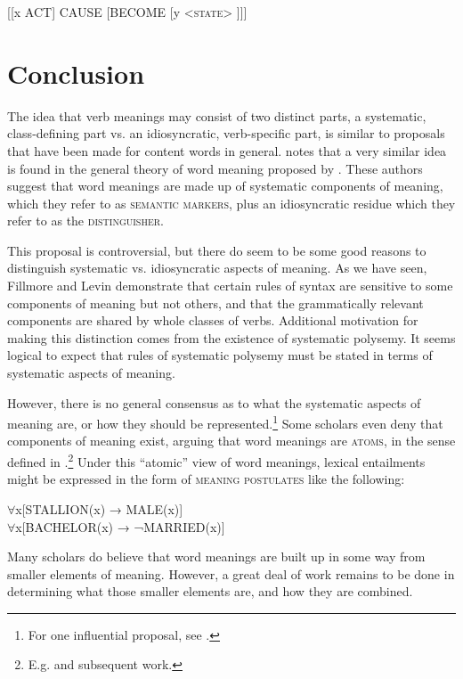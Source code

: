 \ea \label{ex:7.33}
{}[[x ACT] CAUSE [BECOME [y <\textsc{state}> ]]]
\z

\section{Conclusion}\label{sec:} %

The idea that verb meanings may consist of two distinct parts, a systematic, class-defining part vs. an idiosyncratic, verb-specific part, is similar to proposals that have been made for content words in general. \citet[131]{Fillmore1970} notes that a very similar idea is found in the general theory of word meaning proposed by \citet{KatzFodor1963}. These authors suggest that word meanings are made up of systematic components of meaning, which they refer to as \textsc{semantic markers}, plus an idiosyncratic residue which they refer to as the \textsc{distinguisher}.



This proposal is controversial, but there do seem to be some good reasons to distinguish systematic vs. idiosyncratic aspects of meaning. As we have seen, Fillmore and Levin demonstrate that certain rules of syntax are sensitive to some components of meaning but not others, and that the grammatically relevant components are shared by whole classes of verbs. Additional motivation for making this distinction comes from the existence of systematic polysemy. It seems logical to expect that rules of systematic polysemy must be stated in terms of systematic aspects of meaning.



However, there is no general consensus as to what the systematic aspects of meaning are, or how they should be represented.\footnote{For one influential proposal, see \citet{Pustejovsky1995}.} Some scholars even deny that components of meaning exist, arguing that word meanings are \textsc{atoms}, in the sense defined in .\footnote{E.g. \citet{Fodor1975} and subsequent work.} Under this “atomic” view of word meanings, lexical entailments might be expressed in the form of \textsc{meaning postulates} like the following:


\ea
${\forall}$x[STALLION(x) → MALE(x)]\\
${\forall}$x[BACHELOR(x) → ¬MARRIED(x)]
\z


Many scholars do believe that word meanings are built up in some way from smaller elements of meaning. However, a great deal of work remains to be done in determining what those smaller elements are, and how they are combined.



